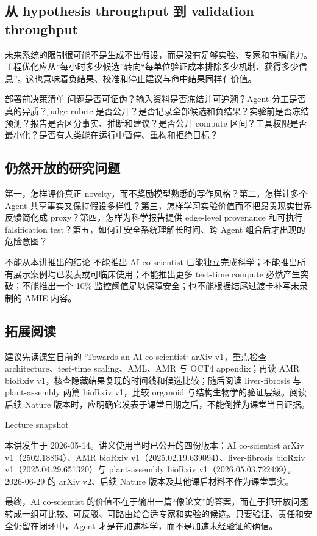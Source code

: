 \subsection{从 hypothesis throughput 到 validation throughput}

未来系统的限制很可能不是生成不出假设，而是没有足够实验、专家和审稿能力。工程优化应从“每小时多少候选”转向“每单位验证成本排除多少机制、获得多少信息”。这也意味着负结果、校准和停止建议与命中结果同样有价值。

\begin{knowledgebox}{部署前决策清单}
问题是否可证伪？输入资料是否冻结并可追溯？Agent 分工是否真的异质？judge rubric 是否公开？是否记录全部候选和负结果？实验前是否冻结预测？报告是否区分事实、推断和建议？是否公开 compute 区间？工具权限是否最小化？是否有人类能在运行中暂停、重构和拒绝目标？
\end{knowledgebox}

\subsection{仍然开放的研究问题}

第一，怎样评价真正 novelty，而不奖励模型熟悉的写作风格？第二，怎样让多个 Agent 共享事实又保持假设多样性？第三，怎样学习实验价值而不把昂贵现实世界反馈简化成 proxy？第四，怎样为科学报告提供 edge-level provenance 和可执行 falsification test？第五，如何让安全系统理解长时间、跨 Agent 组合后才出现的危险意图？

\begin{warningbox}{不能从本讲推出的结论}
不能推出 AI co-scientist 已能独立完成科学；不能推出所有展示案例均已发表或可临床使用；不能推出更多 test-time compute 必然产生突破；不能推出一个 10\% 监控阈值足以保障安全；也不能根据结尾过渡卡补写未录制的 AMIE 内容。
\end{warningbox}

\subsection{拓展阅读}

建议先读课堂日前的 `Towards an AI co-scientist` arXiv v1，重点检查 architecture、test-time scaling、AML、AMR 与 OCT4 appendix；再读 AMR bioRxiv v1，核查隐藏结果复现的时间线和候选比较；随后阅读 liver-fibrosis 与 plant-assembly 两篇 bioRxiv v1，比较 organoid 与结构生物学的验证层级。阅读后续 Nature 版本时，应明确它发表于课堂日期之后，不能倒推为课堂当日证据。

\begin{knowledgebox}{Lecture snapshot}
\raggedright
本讲发生于 2026-05-14。讲义使用当时已公开的四份版本：AI co-scientist arXiv v1（2502.18864）、AMR bioRxiv v1（2025.02.19.639094）、liver-fibrosis bioRxiv v1（2025.04.29.651320）与 plant-assembly bioRxiv v1（2026.05.03.722499）。2026-06-29 的 arXiv v2、后续 Nature 版本及其他课后材料不作为课堂事实。
\end{knowledgebox}

\enlargethispage{3\baselineskip}
最终，AI co-scientist 的价值不在于输出一篇“像论文”的答案，而在于把开放问题转成一组可比较、可反驳、可路由给合适专家和实验的候选。只要验证、责任和安全仍留在闭环中，Agent 才是在加速科学，而不是加速未经验证的确信。


